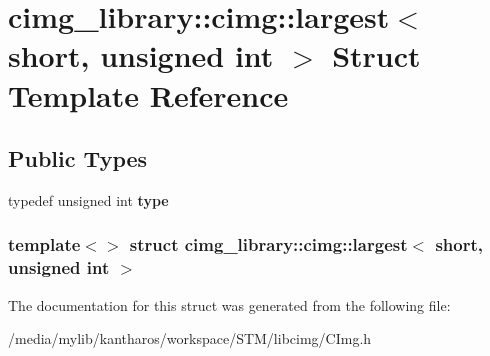 \hypertarget{structcimg__library_1_1cimg_1_1largest_3_01short_00_01unsigned_01int_01_4}{
\section{cimg\_\-library::cimg::largest$<$ short, unsigned int $>$ Struct Template Reference}
\label{structcimg__library_1_1cimg_1_1largest_3_01short_00_01unsigned_01int_01_4}
}
\subsection*{Public Types}
\begin{DoxyCompactItemize}
\item 
\hypertarget{structcimg__library_1_1cimg_1_1largest_3_01short_00_01unsigned_01int_01_4_a230aadcd7dbfd87dcd65d74cd5567d9d}{
typedef unsigned int {\bfseries type}}
\label{structcimg__library_1_1cimg_1_1largest_3_01short_00_01unsigned_01int_01_4_a230aadcd7dbfd87dcd65d74cd5567d9d}

\end{DoxyCompactItemize}
\subsubsection*{template$<$$>$ struct cimg\_\-library::cimg::largest$<$ short, unsigned int $>$}



The documentation for this struct was generated from the following file:\begin{DoxyCompactItemize}
\item 
/media/mylib/kantharos/workspace/STM/libcimg/CImg.h\end{DoxyCompactItemize}
